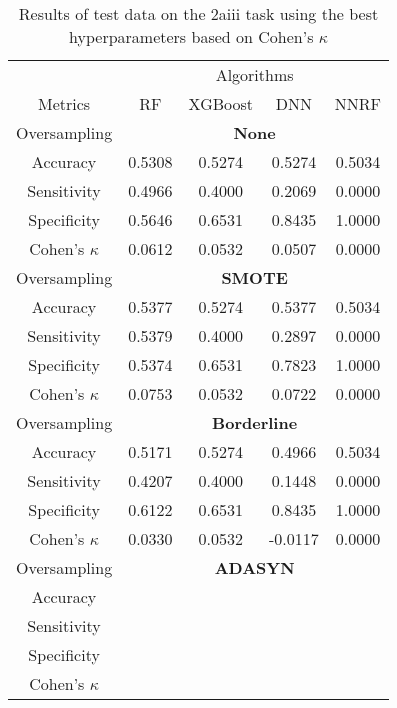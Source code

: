 \begin{table}[!htb]
\centering
\caption{Results of test data on the 2aiii task using the best hyperparameters based on Cohen's $\kappa$}
\label{tab:2aiii_test_results}
\begin{tabular}{c | c c c c}
\hline
 & \multicolumn{4}{c}{Algorithms}\\ 
Metrics &RF & XGBoost & DNN & NNRF\\ 
\hline
Oversampling &\multicolumn{4}{|c}{\textbf{None}}\\ 
\hline
Accuracy & 0.5308 & 0.5274 & 0.5274 & 0.5034\\ 
Sensitivity & 0.4966 & 0.4000 & 0.2069 & 0.0000\\ 
Specificity & 0.5646 & 0.6531 & 0.8435 & 1.0000\\ 
Cohen's $\kappa$ & 0.0612 & 0.0532 & 0.0507 & 0.0000\\ 
\hline
Oversampling &\multicolumn{4}{|c}{\textbf{SMOTE}}\\ 
\hline
Accuracy & 0.5377 & 0.5274 & 0.5377 & 0.5034\\ 
Sensitivity & 0.5379 & 0.4000 & 0.2897 & 0.0000\\ 
Specificity & 0.5374 & 0.6531 & 0.7823 & 1.0000\\ 
Cohen's $\kappa$ & 0.0753 & 0.0532 & 0.0722 & 0.0000\\ 
\hline
Oversampling &\multicolumn{4}{|c}{\textbf{Borderline}}\\ 
\hline
Accuracy & 0.5171 & 0.5274 & 0.4966 & 0.5034\\ 
Sensitivity & 0.4207 & 0.4000 & 0.1448 & 0.0000\\ 
Specificity & 0.6122 & 0.6531 & 0.8435 & 1.0000\\ 
Cohen's $\kappa$ & 0.0330 & 0.0532 & -0.0117 & 0.0000\\ 
\hline
Oversampling &\multicolumn{4}{|c}{\textbf{ADASYN}}\\ 
\hline
Accuracy &  &  &  & \\ 
Sensitivity &  &  &  & \\ 
Specificity &  &  &  & \\ 
Cohen's $\kappa$ &  &  &  & \\ 
\hline
\end{tabular}
\end{table}

